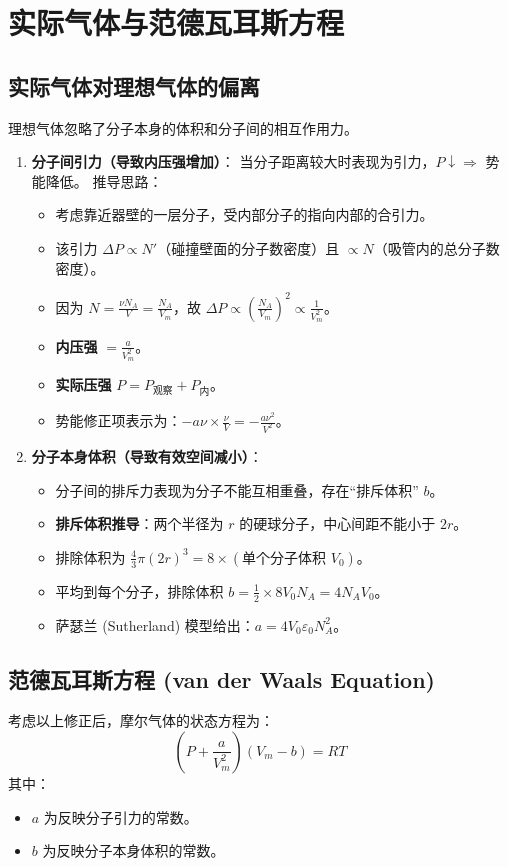 \documentclass{article}
\begin{document}
\section{实际气体与范德瓦耳斯方程}

\subsection{实际气体对理想气体的偏离}
理想气体忽略了分子本身的体积和分子间的相互作用力。
\begin{enumerate}
    \item \textbf{分子间引力（导致内压强增加）}：
    当分子距离较大时表现为引力，$P \downarrow \Rightarrow$ 势能降低。
    推导思路：
    \begin{itemize}
        \item 考虑靠近器壁的一层分子，受内部分子的指向内部的合引力。
        \item 该引力 $\Delta P \propto N'$（碰撞壁面的分子数密度）且 $\propto N$（吸管内的总分子数密度）。
        \item 因为 $N = \frac{\nu N_A}{V} = \frac{N_A}{V_m}$，故 $\Delta P \propto \left(\frac{N_A}{V_m}\right)^2 \propto \frac{1}{V_m^2}$。
        \item \textbf{内压强} $= \frac{a}{V_m^2}$。
        \item \textbf{实际压强} $P = P_{\text{观察}} + P_{\text{内}}$。
        \item 势能修正项表示为：$-a \nu \times \frac{\nu}{V} = - \frac{a \nu^2}{V^2}$。
    \end{itemize}
    \item \textbf{分子本身体积（导致有效空间减小）}：
    \begin{itemize}
        \item 分子间的排斥力表现为分子不能互相重叠，存在“排斥体积” $b$。
        \item \textbf{排斥体积推导}：两个半径为 $r$ 的硬球分子，中心间距不能小于 $2r$。
        \item 排除体积为 $\frac{4}{3}\pi (2r)^3 = 8 \times (\text{单个分子体积 } V_0)$。
        \item 平均到每个分子，排除体积 $b = \frac{1}{2} \times 8 V_0 N_A = 4 N_A V_0$。
        \item 萨瑟兰 (Sutherland) 模型给出：$a = 4 V_0 \varepsilon_0 N_A^2$。
    \end{itemize}
\end{enumerate}

\subsection{范德瓦耳斯方程 (van der Waals Equation)}
考虑以上修正后，摩尔气体的状态方程为：
\[ \left( P + \frac{a}{V_m^2} \right)(V_m - b) = RT \]
其中：
\begin{itemize}
    \item $a$ 为反映分子引力的常数。
    \item $b$ 为反映分子本身体积的常数。
\end{itemize}
\end{document}
